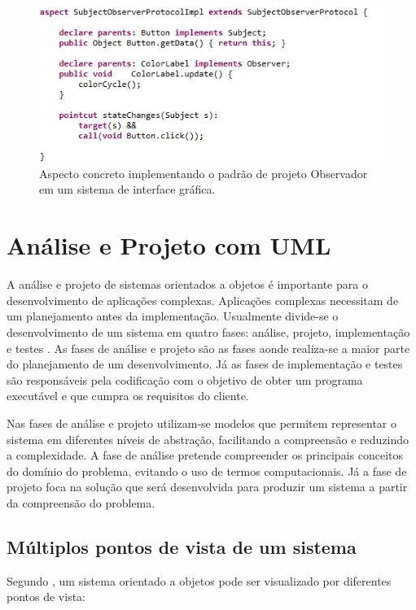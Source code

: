\begin{figure}
	\centering
	\includegraphics{img/aspects_observer_2.png}
	\caption{Aspecto concreto implementando o
	padrão de projeto Observador em um sistema de
	interface gráfica.}\label{fig:aspects_observer_2}
\end{figure}

\section{Análise e Projeto com UML}

A análise e projeto de sistemas orientados a objetos é importante para o
desenvolvimento de aplicações complexas. Aplicações complexas necessitam de um
planejamento antes da implementação. Usualmente divide-se o desenvolvimento de
um sistema em quatro fases: análise, projeto, implementação e testes
\cite{pressman:01}. As fases de análise e projeto são as fases aonde realiza-se 
a maior parte do planejamento de um desenvolvimento. Já as fases de
implementação e testes são responsáveis pela codificação com o objetivo de obter
um programa executável e que cumpra os requisitos do cliente. 

Nas fases de análise e projeto utilizam-se modelos que permitem representar o
sistema em diferentes níveis de abstração, facilitando a compreensão e reduzindo
a complexidade. A fase de análise pretende compreender os principais conceitos
do domínio do problema, evitando o uso de termos computacionais. Já a fase de
projeto foca na solução que será desenvolvida para produzir um sistema a partir
da compreensão do problema. 

\subsection{Múltiplos pontos de vista de um sistema}

Segundo \cite{silva:07}, um sistema orientado a objetos pode ser visualizado por
diferentes pontos de vista:

